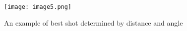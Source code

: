 \documentclass[12pt]{report}
\begin{document}
 \begin{figure}[htp]
    \centering
    \texttt{[image: image5.png]}
    \caption{An example of best shot determined by distance and angle}
    \label{fig:bestshot}
\end{figure}



\newpage


\end{document}
